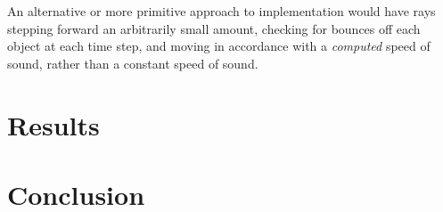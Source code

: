 \documentclass[10pt]{article}
\begin{document}
An alternative or more primitive approach to implementation would have rays
stepping forward an arbitrarily small amount, checking for bounces off each
object at each time step, and moving in accordance with a \emph{computed} speed
of sound, rather than a constant speed of sound.

\section{Results}

\section{Conclusion}

\printbibliography
\end{document}
